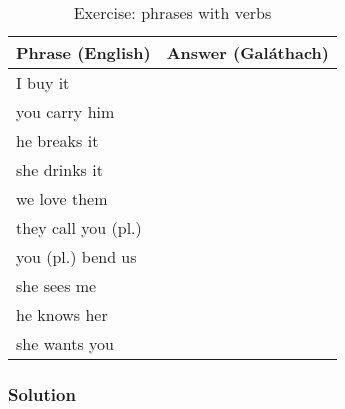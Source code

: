 \begin{table}[H]
\centering
\begin{tabu}{|l|p{10.0cm}|}
  \toprule
  \textbf{Phrase (English)} & \textbf{Answer (Gal\'{a}thach)}\\
  \toprule
  I buy it & \\
  \midrule
  you carry him & \\
  \midrule
  he breaks it & \\
  \midrule
  she drinks it & \\
  \midrule
  we love them & \\
  \midrule
  they call you (pl.) & \\
  \midrule
  you (pl.) bend us & \\
  \midrule
  she sees me & \\
  \midrule
  he knows her & \\
  \midrule
  she wants you & \\
  \bottomrule
\end{tabu}
\label{exercise_phrases_with_verbs}
\caption{Exercise: phrases with verbs}
\end{table}

\newpage
\subsubsection{Solution}
\begin{table}[H]
\centering
{}
\label{solution_phrases_with_verbs}
\caption{Solution: phrases with verbs}
\end{table}
\newpage

